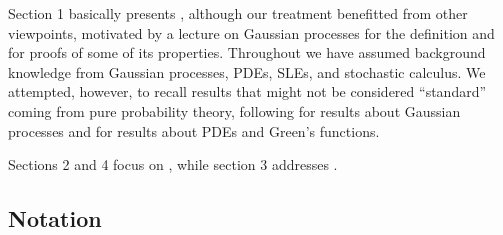 \documentclass[11pt,reqno]{amsart}
\numberwithin{equation}{section}
\begin{document}
Section 1 basically presents \cite{She07}, although our treatment benefitted from other viewpoints, motivated by a lecture on Gaussian processes for the definition and \cite{Bourbaki} for proofs of some of its properties. Throughout we have assumed background knowledge from Gaussian processes, PDEs, SLEs, and stochastic calculus. We attempted, however, to recall results that might not be considered ``standard'' coming from pure probability theory, following \cite{Nickl} for results about Gaussian processes and \cite{Evans} for results about PDEs and Green's functions.

Sections 2 and 4 focus on \cite{Dup10}, while section 3 addresses \cite{She15}.

\subsection*{Notation}
\end{document}
